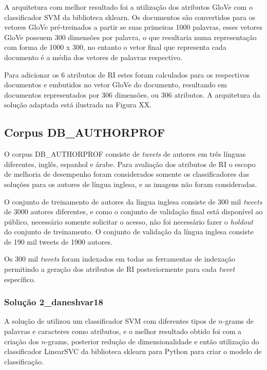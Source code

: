 				A arquitetura com melhor resultado foi a utilização dos atributos GloVe com o classificador SVM da biblioteca sklearn.
				Os documentos são convertidos para os vetores GloVe pré-treinados a partir se suas primeiras 1000 palavras, esses vetores GloVe possuem 300 dimensões por palavra, o que resultaria numa representação com forma de 1000 x 300, no entanto o vetor final que representa cada documento é a média dos vetores de palavras respectivo.

				Para adicionar os 6 atributos de RI estes foram calculados para os respectivos documentos e embutidos no vetor GloVe do documento, resultando em documentos representados por 306 dimensões, ou 306 atributos.
				A arquitetura da solução adaptada está ilustrada na Figura XX.

		\subsection{Corpus DB\_AUTHORPROF}
			O corpus DB\_AUTHORPROF consiste de \textit{tweets} de autores em três línguas diferentes, inglês, espanhol e árabe.
			Para avaliação dos atributos de RI o escopo de melhoria de desempenho foram considerados somente os classificadores das soluções para os autores de língua inglesa, e as imagens não foram consideradas.

			O conjunto de treinamento de autores da língua inglesa consiste de 300 mil \textit{tweets} de 3000 autores diferentes, e como o conjunto de validação final está disponível ao público, necessário somente solicitar o acesso, não foi necessário fazer o \textit{holdout} do conjunto de treinamento.
			O conjunto de validação da língua inglesa consiste de 190 mil tweets de 1900 autores.

			Os 300 mil \textit{tweets} foram indexados em todas as ferramentas de indexação permitindo a geração dos atributos de RI posteriormente para cada \textit{tweet} específico.

			\subsubsection{Solução 2\_daneshvar18}
				A solução de  utilizou um classificador SVM com diferentes tipos de $n$-grams de palavras e caracteres como atributos, e o melhor resultado obtido foi com a criação dos $n$-grams, posterior redução de dimensionalidade e então utilização do classificador LinearSVC da biblioteca sklearn para Python para criar o modelo de classificação.

